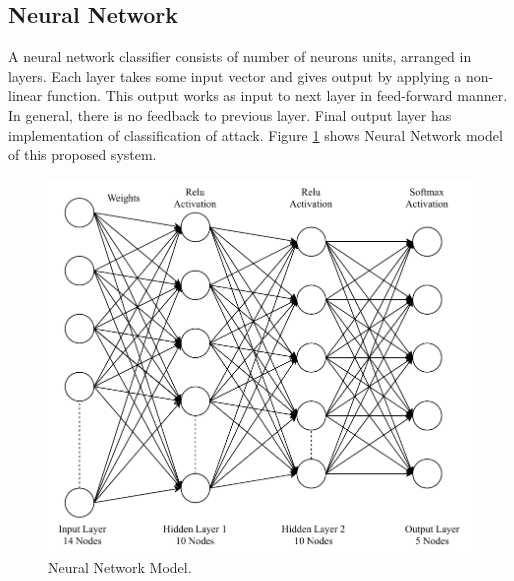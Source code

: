     
    
    \subsection{Neural Network} \label{SSNN}
    A neural network classifier consists of number of neurons units, arranged in layers. Each layer takes some input vector and gives output by applying a non-linear function. This output works as input to next layer in feed-forward manner. In general, there is no feedback to previous layer. Final output layer has implementation of classification of attack. Figure \ref{NN} shows Neural Network model of this proposed system.
    \begin{figure}[h]
    \center	
    \includegraphics[scale=0.9]{Figures/PDF/NN.pdf}	
    \caption{Neural Network Model.}
    \label{NN}	
    \end{figure}
    
